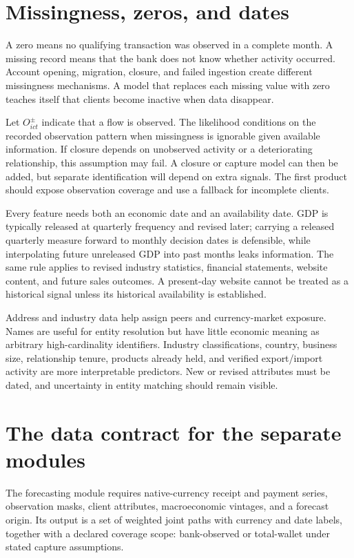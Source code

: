 \section{Missingness, zeros, and dates}
A zero means no qualifying transaction was observed in a complete month. A missing record means that the bank does not know whether activity occurred. Account opening, migration, closure, and failed ingestion create different missingness mechanisms. A model that replaces each missing value with zero teaches itself that clients become inactive when data disappear.

Let $O_{ict}^{\pm}$ indicate that a flow is observed. The likelihood conditions on the recorded observation pattern when missingness is ignorable given available information. If closure depends on unobserved activity or a deteriorating relationship, this assumption may fail. A closure or capture model can then be added, but separate identification will depend on extra signals. The first product should expose observation coverage and use a fallback for incomplete clients.

Every feature needs both an economic date and an availability date. GDP is typically released at quarterly frequency and revised later; carrying a released quarterly measure forward to monthly decision dates is defensible, while interpolating future unreleased GDP into past months leaks information. The same rule applies to revised industry statistics, financial statements, website content, and future sales outcomes. A present-day website cannot be treated as a historical signal unless its historical availability is established.

Address and industry data help assign peers and currency-market exposure. Names are useful for entity resolution but have little economic meaning as arbitrary high-cardinality identifiers. Industry classifications, country, business size, relationship tenure, products already held, and verified export/import activity are more interpretable predictors. New or revised attributes must be dated, and uncertainty in entity matching should remain visible.

\section{The data contract for the separate modules}
The forecasting module requires native-currency receipt and payment series, observation masks, client attributes, macroeconomic vintages, and a forecast origin. Its output is a set of weighted joint paths with currency and date labels, together with a declared coverage scope: bank-observed or total-wallet under stated capture assumptions.

